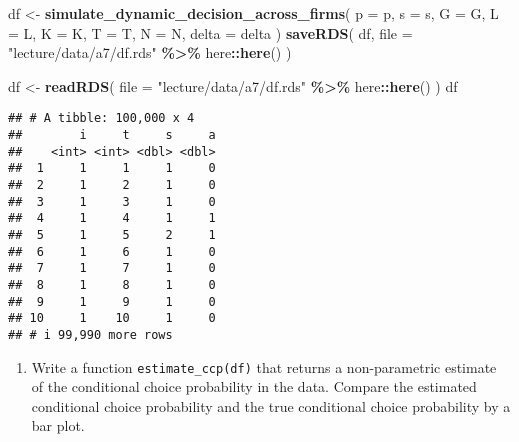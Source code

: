 \documentclass[
]{book}
\newenvironment{Shaded}{\begin{snugshade}}{\end{snugshade}}
\newcommand{\AttributeTok}[1]{\textcolor[rgb]{0.13,0.29,0.53}{#1}}
\newcommand{\FunctionTok}[1]{\textcolor[rgb]{0.13,0.29,0.53}{\textbf{#1}}}
\newcommand{\NormalTok}[1]{#1}
\newcommand{\OtherTok}[1]{\textcolor[rgb]{0.56,0.35,0.01}{#1}}
\newcommand{\SpecialCharTok}[1]{\textcolor[rgb]{0.81,0.36,0.00}{\textbf{#1}}}
\newcommand{\StringTok}[1]{\textcolor[rgb]{0.31,0.60,0.02}{#1}}
\providecommand{\tightlist}{%
  \setlength{\itemsep}{0pt}\setlength{\parskip}{0pt}}
\begin{document}
\begin{Shaded}
\begin{Highlighting}[]
\NormalTok{df }\OtherTok{\textless{}{-}} 
  \FunctionTok{simulate\_dynamic\_decision\_across\_firms}\NormalTok{(}
    \AttributeTok{p =}\NormalTok{ p, }
    \AttributeTok{s =}\NormalTok{ s,  }
    \AttributeTok{G =}\NormalTok{ G, }
    \AttributeTok{L =}\NormalTok{ L, }
    \AttributeTok{K =}\NormalTok{ K, }
    \AttributeTok{T =}\NormalTok{ T, }
    \AttributeTok{N =}\NormalTok{ N, }
    \AttributeTok{delta =}\NormalTok{ delta}
\NormalTok{    )}
\FunctionTok{saveRDS}\NormalTok{(}
\NormalTok{  df, }
  \AttributeTok{file =} \StringTok{"lecture/data/a7/df.rds"} \SpecialCharTok{\%\textgreater{}\%}\NormalTok{ here}\SpecialCharTok{::}\FunctionTok{here}\NormalTok{()}
\NormalTok{)}
\end{Highlighting}
\end{Shaded}

\begin{Shaded}
\begin{Highlighting}[]
\NormalTok{df }\OtherTok{\textless{}{-}} 
  \FunctionTok{readRDS}\NormalTok{(}
    \AttributeTok{file =} \StringTok{"lecture/data/a7/df.rds"} \SpecialCharTok{\%\textgreater{}\%}\NormalTok{ here}\SpecialCharTok{::}\FunctionTok{here}\NormalTok{()}
\NormalTok{  )}
\NormalTok{df}
\end{Highlighting}
\end{Shaded}

\begin{verbatim}
## # A tibble: 100,000 x 4
##        i     t     s     a
##    <int> <int> <dbl> <dbl>
##  1     1     1     1     0
##  2     1     2     1     0
##  3     1     3     1     0
##  4     1     4     1     1
##  5     1     5     2     1
##  6     1     6     1     0
##  7     1     7     1     0
##  8     1     8     1     0
##  9     1     9     1     0
## 10     1    10     1     0
## # i 99,990 more rows
\end{verbatim}

\begin{enumerate}
\def\labelenumi{\arabic{enumi}.}
\setcounter{enumi}{8}
\tightlist
\item
  Write a function \texttt{estimate\_ccp(df)} that returns a non-parametric estimate of the conditional choice probability in the data. Compare the estimated conditional choice probability and the true conditional choice probability by a bar plot.
\end{enumerate}
\end{document}
